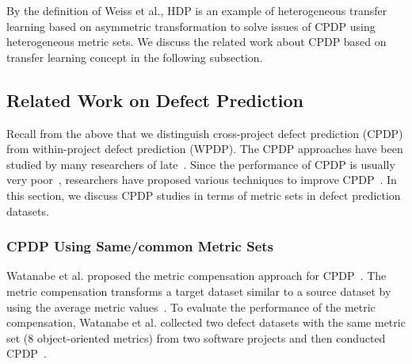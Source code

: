By the definition of Weiss et al., HDP is an example of heterogeneous transfer learning based on asymmetric transformation to solve issues of CPDP using heterogeneous metric sets. We discuss the related work about CPDP based on transfer learning concept in the following subsection.

\subsection{Related Work on Defect Prediction}
\label{sec:Background}
Recall from the above that we distinguish cross-project defect prediction (CPDP) from within-project defect prediction (WPDP).
The CPDP approaches have been studied by many researchers
of late~\cite{Canfora13,Ma12,Nam13,Panichella14,Rahman12,Ryu14,Ryu15,Turhan09,Zhang15,Zimmermann09}. Since the performance
of CPDP is usually very poor~\cite{Zimmermann09}, researchers have proposed various techniques to
improve CPDP~\cite{Canfora13,Ma12,Nam13,Panichella14,Ryu14,Ryu15,Turhan09,Watanabe08}. In this section, we discuss CPDP studies in terms of metric sets in defect prediction datasets.

  
\subsubsection{CPDP Using Same/common Metric Sets}
Watanabe et al. proposed the metric compensation approach for
CPDP~\cite{Watanabe08}. The metric compensation transforms a target dataset
similar to a source dataset by using the average metric
values~\cite{Watanabe08}.
To evaluate the performance of the metric compensation, Watanabe et al. collected
two defect datasets with the same metric set (8 object-oriented
metrics) from two software projects and then conducted
CPDP~\cite{Watanabe08}.

